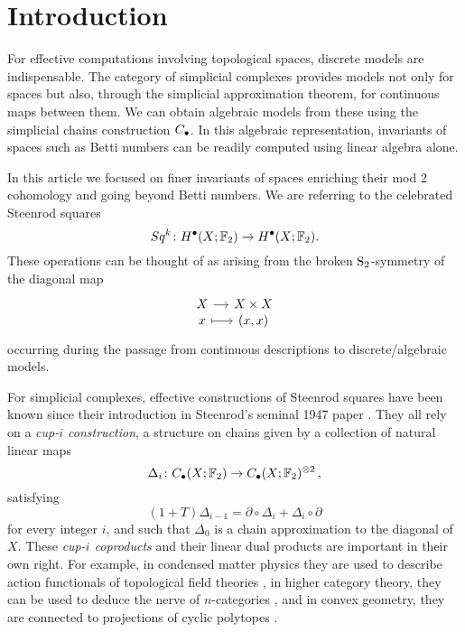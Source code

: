 
\section{Introduction}

For effective computations involving topological spaces, discrete models are indispensable.
The category of simplicial complexes provides models not only for spaces but also, through the simplicial approximation theorem, for continuous maps between them.
We can obtain algebraic models from these using the simplicial chains construction $\chains$.
In this algebraic representation, invariants of spaces such as Betti numbers can be readily computed using linear algebra alone.

In this article we focused on finer invariants of spaces enriching their mod 2 cohomology and going beyond Betti numbers.
We are referring to the celebrated Steenrod squares
\begin{equation*}
Sq^k \colon H^\bullet(X; \F_2) \to H^\bullet(X; \F_2).
\end{equation*}
These operations can be thought of as arising from the broken $\S_2$-symmetry of the diagonal map
\begin{equation*}
\begin{tikzcd}[column sep=small, row sep=-3pt]
X \arrow[r] & X \times X \\
x \arrow[r, mapsto] & (x,x)
\end{tikzcd}
\end{equation*}
occurring during the passage from continuous descriptions to discrete/algebraic models.

For simplicial complexes, effective constructions of Steenrod squares have been known since their introduction in Steenrod's seminal 1947 paper \cite{steenrod47}.
They all rely on a \textit{cup-$i$ construction}, a structure on chains given by a collection of natural linear maps
\begin{equation*}
\Delta_i \colon \chains(X; \F_2)  \to \chains(X; \F_2)^{\otimes 2}\,,
\end{equation*}
satisfying
\begin{equation*}
(1+T) \Delta_{i-1} = \partial \circ \Delta_i + \Delta_i \circ \partial
\end{equation*}
for every integer $i$, and such that $\Delta_0$ is a chain approximation to the diagonal of $X$.
These \textit{cup-$i$ coproducts} and their linear dual products are important in their own right.
For example, in condensed matter physics they are used to describe action functionals of topological field theories \cite{gaiotto2016spin, bhardwaj2017state, kapustin2017fermionic}, in higher category theory, they can be used to deduce the nerve of $n$-categories \cite{medina2020globular}, and in convex geometry, they are connected to projections of cyclic polytopes \cite{kapranov1991combinatorial}.

